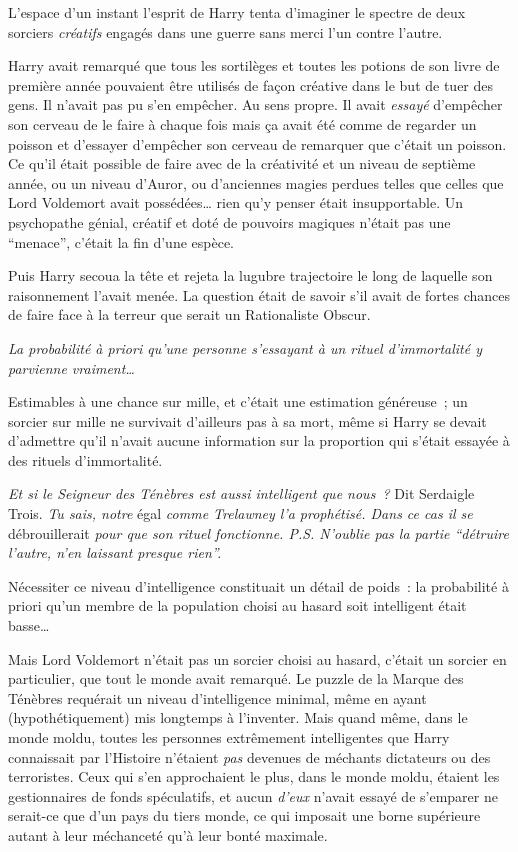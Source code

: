 L'espace d'un instant l'esprit de Harry tenta d'imaginer le spectre de deux sorciers \emph{créatifs} engagés dans une guerre sans merci l'un contre l'autre.

Harry avait remarqué que tous les sortilèges et toutes les potions de son livre de première année pouvaient être utilisés de façon créative dans le but de tuer des gens.
Il n'avait pas pu s'en empêcher.
Au sens propre.
Il avait \emph{essayé} d'empêcher son cerveau de le faire à chaque fois mais ça avait été comme de regarder un poisson et d'essayer d'empêcher son cerveau de remarquer que c'était un poisson.
Ce qu'il était possible de faire avec de la créativité et un niveau de septième année, ou un niveau d'Auror, ou d'anciennes magies perdues telles que celles que Lord Voldemort avait possédées… rien qu'y penser était insupportable.
Un psychopathe génial, créatif et doté de pouvoirs magiques n'était pas une “menace”, c'était la fin d'une espèce.

Puis Harry secoua la tête et rejeta la lugubre trajectoire le long de laquelle son raisonnement l'avait menée.
La question était de savoir s'il avait de fortes chances de faire face à la terreur que serait un Rationaliste Obscur.

\emph{La probabilité à priori qu'une personne s'essayant à un rituel d'immortalité y parvienne vraiment…}

Estimables à une chance sur mille, et c'était une estimation généreuse~; un sorcier sur mille ne survivait d'ailleurs pas à sa mort, même si Harry se devait d'admettre qu'il n'avait aucune information sur la proportion qui s'était essayée à des rituels d'immortalité.

\emph{Et si le Seigneur des Ténèbres est aussi intelligent que nous~?} Dit Serdaigle Trois.
\emph{Tu sais, notre} égal \emph{comme Trelawney l'a prophétisé.
Dans ce cas il se} débrouillerait \emph{pour que son rituel fonctionne.
P.S. N'oublie pas la partie “détruire l'autre, n'en laissant presque rien”.}

Nécessiter ce niveau d'intelligence constituait un détail de poids~: la probabilité à priori qu'un membre de la population choisi au hasard soit intelligent était basse…

Mais Lord Voldemort n'était pas un sorcier choisi au hasard, c'était un sorcier en particulier, que tout le monde avait remarqué.
Le puzzle de la Marque des Ténèbres requérait un niveau d'intelligence minimal, même en ayant (hypothétiquement) mis longtemps à l'inventer.
Mais quand même, dans le monde moldu, toutes les personnes extrêmement intelligentes que Harry connaissait par l'Histoire n'étaient \emph{pas} devenues de méchants dictateurs ou des terroristes.
Ceux qui s'en approchaient le plus, dans le monde moldu, étaient les gestionnaires de fonds spéculatifs, et aucun \emph{d'eux} n'avait essayé de s'emparer ne serait-ce que d'un pays du tiers monde, ce qui imposait une borne supérieure autant à leur méchanceté qu'à leur bonté maximale.


